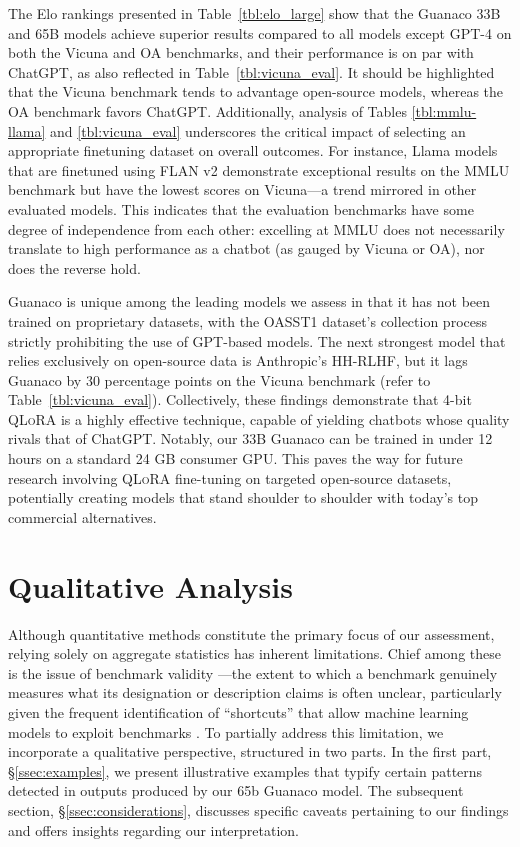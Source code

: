 The Elo rankings presented in Table~\ref{tbl:elo_large} show that the {Guanaco} 33B and 65B models achieve superior results compared to all models except GPT-4 on both the Vicuna and OA benchmarks, and their performance is on par with ChatGPT, as also reflected in Table~\ref{tbl:vicuna_eval}. It should be highlighted that the Vicuna benchmark tends to advantage open-source models, whereas the OA benchmark favors ChatGPT. Additionally, analysis of Tables \ref{tbl:mmlu-llama} and \ref{tbl:vicuna_eval} underscores the critical impact of selecting an appropriate finetuning dataset on overall outcomes. For instance, Llama models that are finetuned using FLAN v2 demonstrate exceptional results on the MMLU benchmark but have the lowest scores on Vicuna—a trend mirrored in other evaluated models. This indicates that the evaluation benchmarks have some degree of independence from each other: excelling at MMLU does not necessarily translate to high performance as a chatbot (as gauged by Vicuna or OA), nor does the reverse hold.

{Guanaco} is unique among the leading models we assess in that it has not been trained on proprietary datasets, with the OASST1 dataset’s collection process strictly prohibiting the use of GPT-based models. The next strongest model that relies exclusively on open-source data is Anthropic’s HH-RLHF, but it lags {Guanaco} by 30 percentage points on the Vicuna benchmark (refer to Table~\ref{tbl:vicuna_eval}). Collectively, these findings demonstrate that 4-bit \textsc{QLoRA} is a highly effective technique, capable of yielding chatbots whose quality rivals that of ChatGPT. Notably, our 33B {Guanaco} can be trained in under 12 hours on a standard 24 GB consumer GPU. This paves the way for future research involving \textsc{QLoRA} fine-tuning on targeted open-source datasets, potentially creating models that stand shoulder to shoulder with today’s top commercial alternatives.

\section{Qualitative Analysis}

Although quantitative methods constitute the primary focus of our assessment, relying solely on aggregate statistics has inherent limitations. Chief among these is the issue of benchmark validity \citep{liao2021we}—the extent to which a benchmark genuinely measures what its designation or description claims is often unclear, particularly given the frequent identification of ``shortcuts'' that allow machine learning models to exploit benchmarks \citep{gururangan2018annotation, poliak2018hypothesis}. To partially address this limitation, we incorporate a qualitative perspective, structured in two parts. In the first part, \S\ref{ssec:examples}, we present illustrative examples that typify certain patterns detected in outputs produced by our 65b {Guanaco} model. The subsequent section, \S\ref{ssec:considerations}, discusses specific caveats pertaining to our findings and offers insights regarding our interpretation.

